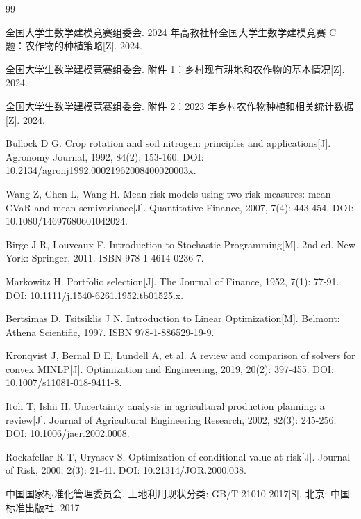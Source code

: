 \documentclass[bwprint]{gmcmthesis}
\begin{document}
\begin{thebibliography}{99}

 全国大学生数学建模竞赛组委会. 2024 年高教社杯全国大学生数学建模竞赛 C 题：农作物的种植策略[Z]. 2024.

 全国大学生数学建模竞赛组委会. 附件 1：乡村现有耕地和农作物的基本情况[Z]. 2024.

 全国大学生数学建模竞赛组委会. 附件 2：2023 年乡村农作物种植和相关统计数据[Z]. 2024.

 Bullock D G. Crop rotation and soil nitrogen: principles and applications[J]. Agronomy Journal, 1992, 84(2): 153-160. DOI: 10.2134/agronj1992.00021962008400020003x.

 Wang Z, Chen L, Wang H. Mean-risk models using two risk measures: mean-CVaR and mean-semivariance[J]. Quantitative Finance, 2007, 7(4): 443-454. DOI: 10.1080/14697680601042024.

 Birge J R, Louveaux F. Introduction to Stochastic Programming[M]. 2nd ed. New York: Springer, 2011. ISBN 978-1-4614-0236-7.

 Markowitz H. Portfolio selection[J]. The Journal of Finance, 1952, 7(1): 77-91. DOI: 10.1111/j.1540-6261.1952.tb01525.x.

 Bertsimas D, Tsitsiklis J N. Introduction to Linear Optimization[M]. Belmont: Athena Scientific, 1997. ISBN 978-1-886529-19-9.

 Kronqvist J, Bernal D E, Lundell A, et al. A review and comparison of solvers for convex MINLP[J]. Optimization and Engineering, 2019, 20(2): 397-455. DOI: 10.1007/s11081-018-9411-8.

 Itoh T, Ishii H. Uncertainty analysis in agricultural production planning: a review[J]. Journal of Agricultural Engineering Research, 2002, 82(3): 245-256. DOI: 10.1006/jaer.2002.0008.

 Rockafellar R T, Uryasev S. Optimization of conditional value-at-risk[J]. Journal of Risk, 2000, 2(3): 21-41. DOI: 10.21314/JOR.2000.038.

 中国国家标准化管理委员会. 土地利用现状分类: GB/T 21010-2017[S]. 北京: 中国标准出版社, 2017.

\end{thebibliography}
\label{body:end}
\end{document}
